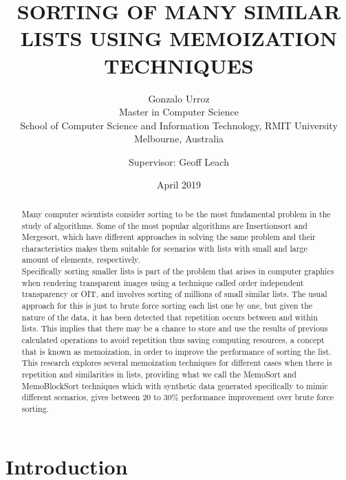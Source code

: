 \documentclass[a4paper,12pt]{article}
\begin{document}
\title{\uppercase{Sorting of many similar lists using memoization techniques}} 
\author{Gonzalo Urroz\\
{\small Master in Computer Science }\\
{\small School of Computer Science and Information Technology, RMIT University } \\
{\small Melbourne, Australia }\\
\and Supervisor: Geoff Leach
}

\date{April 2019}
\maketitle

\begin{abstract}
Many computer scientists consider sorting to be the most fundamental problem in the study of algorithms. Some of the most popular algorithms are Insertionsort and Mergesort, which have different approaches in solving the same problem and their characteristics makes them suitable for scenarios with lists with small and large amount of elements, respectively. \\
Specifically sorting smaller lists is part of the problem that arises in computer graphics when rendering transparent images using a technique called order independent transparency or OIT, and involves sorting of millions of small similar lists. The usual approach for this is just to brute force sorting each list one by one, but given the nature of the data, it has been detected that repetition occurs between and within lists. This implies that there may be a chance to store and use the results of previous calculated operations to avoid repetition thus saving computing resources, a concept that is known as memoization, in order to improve the performance of sorting the list. 
This research explores several memoization techniques for different cases when there is repetition and similarities in lists, providing what we call the MemoSort and MemoBlockSort techniques which with synthetic data  generated specifically to mimic different scenarios, gives between 20 to 30\% performance improvement over brute force sorting.

\end{abstract}

\newpage
\tableofcontents
\newpage

\section{Introduction}
\end{document}
